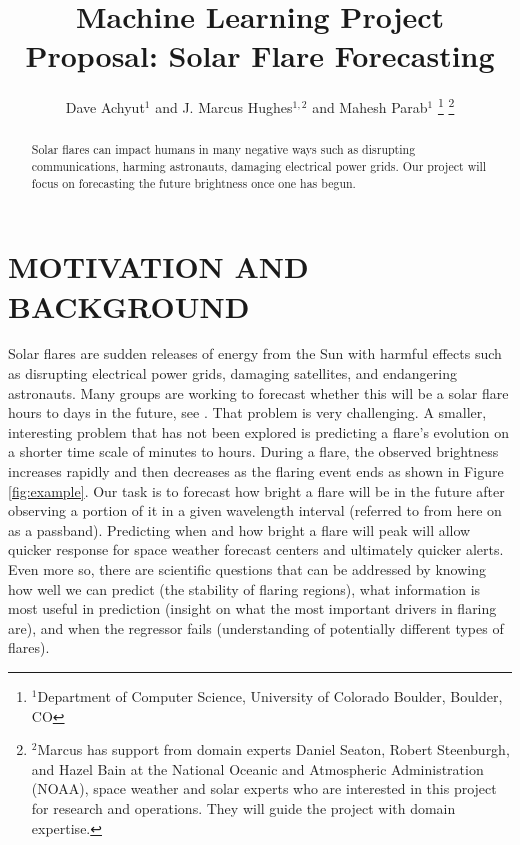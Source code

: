 \documentclass[letterpaper, 10 pt, onecolumn]{ieeeconf}
\title{\LARGE \bf Machine Learning Project Proposal: Solar Flare Forecasting}
\author{Dave Achyut$^{1}$ and J. Marcus Hughes$^{1, 2}$ and Mahesh Parab$^{1}$%
\thanks{$^{1}$Department of Computer Science, University of Colorado Boulder, Boulder, CO}%
\thanks{$^{2}$Marcus has support from domain experts Daniel Seaton, Robert Steenburgh, and Hazel Bain at the National Oceanic and Atmospheric Administration (NOAA), space weather and solar experts who are interested in this project for research and operations. They will guide the project with domain expertise.}
}
\begin{document}
\maketitle
\thispagestyle{empty}
\pagestyle{empty}

\begin{abstract}
Solar flares can impact humans in many negative ways such as disrupting communications, harming astronauts, damaging electrical power grids. Our project will focus on forecasting the future brightness once one has begun. 

\end{abstract}

\section{MOTIVATION AND BACKGROUND}
Solar flares are sudden releases of energy from the Sun with harmful effects such as disrupting electrical power grids, damaging satellites, and endangering astronauts. Many groups are working to forecast whether this will be a solar flare hours to days in the future, see \cite{bobra, guerra, yu, nishizuka}. That problem is very challenging. A smaller, interesting problem that has not been explored is predicting a flare's evolution on a shorter time scale of minutes to hours. During a flare, the observed brightness increases rapidly and then decreases as the flaring event ends as shown in Figure \ref{fig:example}. Our task is to forecast how bright a flare will be in the future after observing a portion of it in a given wavelength interval (referred to from here on as a passband). Predicting when and how bright a flare will peak will allow quicker response for space weather forecast centers and ultimately quicker alerts. Even more so, there are scientific questions that can be addressed by knowing how well we can predict (the stability of flaring regions), what information is most useful in prediction (insight on what the most important drivers in flaring are), and when the regressor fails (understanding of potentially different types of flares).
\end{document}
